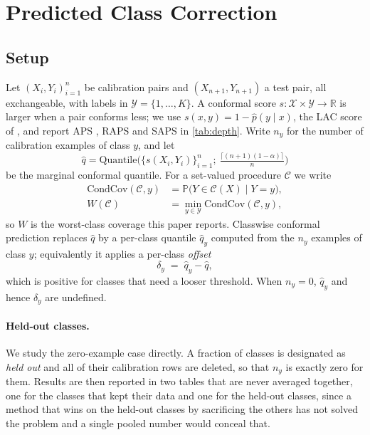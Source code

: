 \section{Predicted Class Correction}
\label{sec:method}

\subsection{Setup}
\label{sec:setup}

Let $(X_i,Y_i)_{i=1}^{n}$ be calibration pairs and $(X_{n+1},Y_{n+1})$ a test pair, all
exchangeable, with labels in $\mathcal{Y}=\{1,\dots,K\}$. A conformal score
$s:\mathcal{X}\times\mathcal{Y}\to\mathbb{R}$ is larger when a pair conforms less; we use
$s(x,y)=1-\hat p(y\mid x)$, the LAC score of \citet{sadinle2019least}, and report APS
\cite{romano2020classification}, RAPS \cite{angelopoulos2021uncertainty} and SAPS
\cite{huang2024conformal} in \cref{tab:depth}. Write $n_y$ for the number of calibration
examples of class $y$, and let
\begin{equation}
\hat q = \mathrm{Quantile}\Big(\{s(X_i,Y_i)\}_{i=1}^n;\ \tfrac{\lceil (n+1)(1-\alpha)\rceil}{n}\Big)
\label{eq:qglobal}
\end{equation}
be the marginal conformal quantile. For a set-valued procedure $\mathcal{C}$ we write
\begin{equation}
\begin{aligned}
\mathrm{CondCov}(\mathcal{C},y) &= \mathbb{P}\bigl(Y\in\mathcal{C}(X)\mid Y=y\bigr), \\
W(\mathcal{C}) &= \min_{y\in\mathcal{Y}} \mathrm{CondCov}(\mathcal{C},y),
\end{aligned}
\label{eq:worst}
\end{equation}
so $W$ is the worst-class coverage this paper reports. Classwise conformal prediction replaces
$\hat q$ by a per-class quantile $\hat q_y$ computed from the $n_y$ examples of class $y$;
equivalently it applies a per-class \emph{offset}
\begin{equation}
\delta_y \;=\; \hat q_y - \hat q ,
\label{eq:delta}
\end{equation}
which is positive for classes that need a looser threshold. When $n_y=0$, $\hat q_y$ and
hence $\delta_y$ are undefined.

\paragraph{Held-out classes.} We study the zero-example case directly. A fraction of classes
is designated as \emph{held out} and all of their calibration rows are deleted, so that
$n_y$ is exactly zero for them. Results are then reported in two tables that
are never averaged together, one for the classes that kept their data and one for the held-out
classes, since a method that wins on the held-out classes by sacrificing the others has not
solved the problem and a single pooled number would conceal that.

